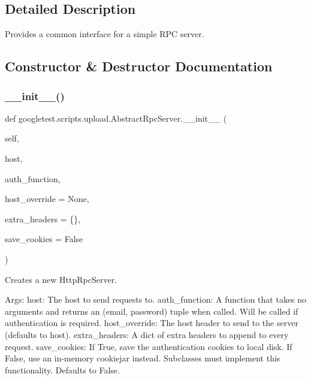 \subsection{Detailed Description}
\begin{DoxyVerb}Provides a common interface for a simple RPC server.\end{DoxyVerb}
 

\subsection{Constructor \& Destructor Documentation}
\mbox{\label{classgoogletest_1_1scripts_1_1upload_1_1_abstract_rpc_server_aeb78ded9d1edafbf85b99bf6cf4309e0}} 
\subsubsection{\texorpdfstring{\_\_init\_\_()}{\_\_init\_\_()}}
{\footnotesize\ttfamily def googletest.\+scripts.\+upload.\+Abstract\+Rpc\+Server.\+\_\+\+\_\+init\+\_\+\+\_\+ (\begin{DoxyParamCaption}\item[{}]{self,  }\item[{}]{host,  }\item[{}]{auth\+\_\+function,  }\item[{}]{host\+\_\+override = {\ttfamily None},  }\item[{}]{extra\+\_\+headers = {\ttfamily \{\}},  }\item[{}]{save\+\_\+cookies = {\ttfamily False} }\end{DoxyParamCaption})}

\begin{DoxyVerb}Creates a new HttpRpcServer.

Args:
  host: The host to send requests to.
  auth_function: A function that takes no arguments and returns an
(email, password) tuple when called. Will be called if authentication
is required.
  host_override: The host header to send to the server (defaults to host).
  extra_headers: A dict of extra headers to append to every request.
  save_cookies: If True, save the authentication cookies to local disk.
If False, use an in-memory cookiejar instead.  Subclasses must
implement this functionality.  Defaults to False.
\end{DoxyVerb}
 

